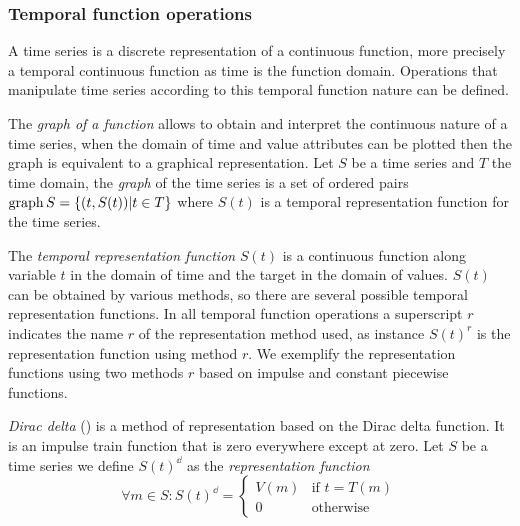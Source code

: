 \subsubsection{Temporal function operations}
\label{sec:model:tfunc}

A time series is a discrete representation of a continuous function,
more precisely a temporal continuous function as time is the function
domain. Operations that manipulate time series according to this
temporal function nature can be defined.

The \emph{graph of a function} allows to obtain and interpret the
continuous nature of a time series, when the domain of time and value
attributes can be plotted then the graph is equivalent to a graphical
representation.  Let $S$ be a time series and $T$ the time domain, the
\emph{graph} of the time series is a set of ordered pairs $\operatorname*{graph} S =
\{ (t,S(t)) | t\in T \}$ where $S(t)$ is a temporal representation
function for the time series.

The \emph{temporal representation function} $S(t)$ is a continuous
function along variable $t$ in the domain of time and the target in
the domain of values. $S(t)$ can be obtained by various methods, so
there are several possible temporal representation functions. In all
temporal function operations a superscript $r$ indicates the name $r$
of the representation method used, as instance $S(t)^r$ is the
representation function using method $r$. We exemplify the
representation functions using two methods $r$ based on impulse and
constant piecewise functions.


\begin{definition}
  \emph{Dirac delta} (\dd) is a method of representation based on the
  Dirac delta function. It is an impulse train function that is zero
  everywhere except at zero.  Let $S$ be a time series we define
  $S(t)^\dd$ as the \emph{\dd{} representation function}
\[
    \forall m \in S: S(t)^\dd
    =  \begin{cases}
      V(m) & \text{if }  t=T(m) \\
      0 & \text{otherwise}
    \end{cases}
\]
\end{definition}

